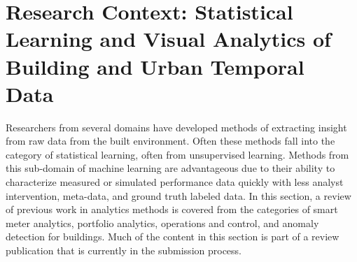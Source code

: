 \section{Research Context: Statistical Learning and Visual Analytics of Building and Urban Temporal Data}
\label{sec:litreview}

Researchers from several domains have developed methods of extracting insight from raw data from the built environment. Often these methods fall into the category of statistical learning, often from unsupervised learning. Methods from this sub-domain of machine learning are advantageous due to their ability to characterize measured or simulated performance data quickly with less analyst intervention, meta-data, and ground truth labeled data. In this section, a review of previous work in analytics methods is covered from the categories of smart meter analytics, portfolio analytics, operations and control, and anomaly detection for buildings. Much of the content in this section is part of a review publication that is currently in the submission process.